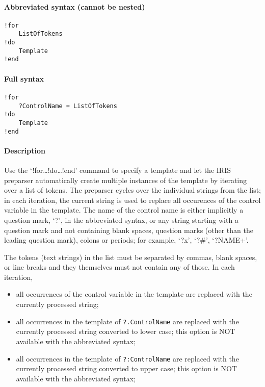 


	\paragraph{Abbreviated syntax (cannot be
nested)}

\begin{verbatim}
!for
    ListOfTokens
!do
    Template
!end
\end{verbatim}

\paragraph{Full syntax}

\begin{verbatim}
!for
    ?ControlName = ListOfTokens
!do
    Template
!end
\end{verbatim}

\paragraph{Description}

Use the `!for\ldots{}!do\ldots{}!end' command to specify a template and
let the IRIS preparser automatically create multiple instances of the
template by iterating over a list of tokens. The preparser cycles over
the individual strings from the list; in each iteration, the current
string is used to replace all occurences of the control variable in the
template. The name of the control name is either implicitly a question
mark, `?', in the abbreviated syntax, or any string starting with a
question mark and not containing blank spaces, question marks (other
than the leading question mark), colons or periods; for example, `?x',
`?\#', `?NAME+'.

The tokens (text strings) in the list must be separated by commas, blank
spaces, or line breaks and they themselves must not contain any of
those. In each iteration,

\begin{itemize}
\item
  all occurrences of the control variable in the template are replaced
  with the currently processed string;
\item
  all occurrences in the template of \texttt{?.ControlName} are replaced
  with the currently processed string converted to lower case; this
  option is NOT available with the abbreviated syntax;
\item
  all occurrences in the template of \texttt{?:ControlName} are replaced
  with the currently processed string converted to upper case; this
  option is NOT available with the abbreviated syntax;
\end{itemize}

